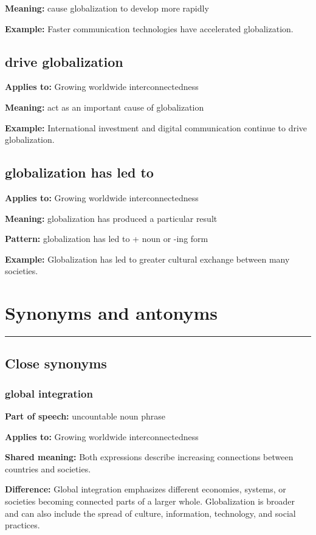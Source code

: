 \documentclass[11pt]{article}
\newcommand{\sectionrule}{\par\vspace{-0.5em}\noindent\textcolor{Accent}{\rule{\linewidth}{0.6pt}}\par}
\begin{document}
\textbf{Meaning:} cause globalization to develop more rapidly

\textbf{Example:} Faster communication technologies have accelerated globalization.

\subsection{drive globalization}
\textbf{Applies to:} Growing worldwide interconnectedness

\textbf{Meaning:} act as an important cause of globalization

\textbf{Example:} International investment and digital communication continue to drive globalization.

\subsection{globalization has led to}
\textbf{Applies to:} Growing worldwide interconnectedness

\textbf{Meaning:} globalization has produced a particular result

\textbf{Pattern:} globalization has led to + noun or -ing form

\textbf{Example:} Globalization has led to greater cultural exchange between many societies.

\section{Synonyms and antonyms}
\sectionrule
\subsection{Close synonyms}
\subsubsection{global integration}
\textbf{Part of speech:} uncountable noun phrase

\textbf{Applies to:} Growing worldwide interconnectedness

\textbf{Shared meaning:} Both expressions describe increasing connections between countries and societies.

\textbf{Difference:} Global integration emphasizes different economies, systems, or societies becoming connected parts of a larger whole. Globalization is broader and can also include the spread of culture, information, technology, and social practices.
\end{document}
